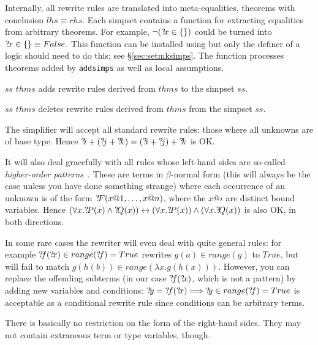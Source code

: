 Internally, all rewrite rules are translated into meta-equalities,
theorems with conclusion $lhs \equiv rhs$.  Each simpset contains a
function for extracting equalities from arbitrary theorems.  For
example, $\neg({?\!x}\in \{\})$ could be turned into ${?\!x}\in \{\}
\equiv False$.  This function can be installed using
 but only the definer of a logic should need to do
this; see \S\ref{sec:setmksimps}.  The function processes theorems
added by \texttt{addsimps} as well as local assumptions.

\begin{ttdescription}
  
\item[$ss$ \ttindexbold{addsimps} $thms$] adds rewrite rules derived
  from $thms$ to the simpset $ss$.
  
\item[$ss$ \ttindexbold{delsimps} $thms$] deletes rewrite rules
  derived from $thms$ from the simpset $ss$.

\end{ttdescription}

\begin{warn}
  The simplifier will accept all standard rewrite rules: those where
  all unknowns are of base type.  Hence ${{?\!i}+({?\!j}+{?\!k})} =
  {({?\!i}+{?\!j})+{?\!k}}$ is OK.
  
  It will also deal gracefully with all rules whose left-hand sides
  are so-called {\em higher-order patterns}~\cite{nipkow-patterns}.
  These are terms in $\beta$-normal form (this will always be the case
  unless you have done something strange) where each occurrence of an
  unknown is of the form ${?\!F}(x@1,\dots,x@n)$, where the $x@i$ are
  distinct bound variables. Hence $(\forall x.{?\!P}(x) \land
  {?\!Q}(x)) \leftrightarrow (\forall x.{?\!P}(x)) \land (\forall
  x.{?\!Q}(x))$ is also OK, in both directions.
  
  In some rare cases the rewriter will even deal with quite general
  rules: for example ${{?\!f}({?\!x})\in range({?\!f})} = True$
  rewrites $g(a) \in range(g)$ to $True$, but will fail to match
  $g(h(b)) \in range(\lambda x.g(h(x)))$.  However, you can replace
  the offending subterms (in our case ${?\!f}({?\!x})$, which is not
  a pattern) by adding new variables and conditions: ${?\!y} =
  {?\!f}({?\!x}) \Longrightarrow {?\!y}\in range({?\!f}) = True$ is
  acceptable as a conditional rewrite rule since conditions can be
  arbitrary terms.
  
  There is basically no restriction on the form of the right-hand
  sides.  They may not contain extraneous term or type variables,
  though.
\end{warn}


